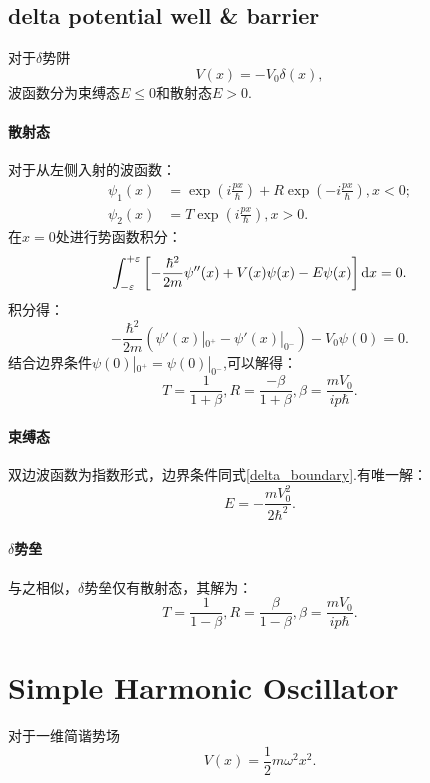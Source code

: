 \subsection{delta potential well \& barrier}
对于$\delta$势阱
\begin{equation}
    V(x)=-V_0\delta(x),
\end{equation}
波函数分为束缚态$E\le 0$和散射态$E>0$.

\paragraph{散射态} 对于从左侧入射的波函数：
\begin{align}
    \psi_1(x)&=\exp\left(i\frac{px}{\hbar}\right)+R\exp\left(-i\frac{px}{\hbar}\right),x<0;\\
    \psi_2(x)&=T\exp\left(i\frac{px}{\hbar}\right),  x>0.
\end{align}
在$x=0$处进行势函数积分：
\begin{equation}
    \int_{-\varepsilon}^{+\varepsilon}\left[-\frac{\hbar^2}{2m}\psi''(x)+V(x)\psi(x)-E\psi(x)\right]\mathrm{d} x=0.
\end{equation}
积分得：
\begin{equation}
    -\frac{\hbar^2}{2m}(\psi'(x)|_{0^+}-\psi'(x)|_{0^-})-V_0\psi(0)=0.
    \label{delta_boundary}
\end{equation}
结合边界条件$\psi(0)|_{0^+}=\psi(0)|_{0^-}$,可以解得：
\begin{equation}
    T=\frac{1}{1+\beta}, R=\frac{-\beta}{1+\beta}, \beta=\frac{mV_0}{ip\hbar}.
\end{equation}

\paragraph{束缚态} 双边波函数为指数形式，边界条件同式\ref{delta_boundary}.有唯一解：
\begin{equation}
    E=-\frac{mV_0^2}{2\hbar^2}.
\end{equation}

\paragraph{$\delta$势垒}与之相似，$\delta$势垒仅有散射态，其解为：
\begin{equation}
    T=\frac{1}{1-\beta}, R=\frac{\beta}{1-\beta}, \beta=\frac{mV_0}{ip\hbar}.
\end{equation}
\section{Simple Harmonic Oscillator}
对于一维简谐势场
\begin{equation}
    V(x)=\frac{1}{2}m\omega^2x^2.
\end{equation}
